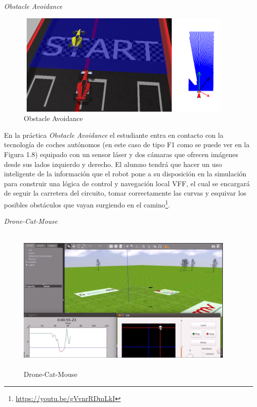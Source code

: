 \vspace{1cm}
\hspace{0.35\linewidth}
\textit{Obstacle Avoidance}

\begin{figure}[H]
  \begin{center}
    \includegraphics[width=0.95\textwidth, height=5cm]{figures/obstacle_avoidance.png}
		\caption{Obstacle Avoidance}
		\label{fig.obstacleavoidance}
		\end{center}
\end{figure}

En la práctica \textit{Obstacle Avoidance} el estudiante entra en contacto con la tecnología de coches autónomos (en este caso de tipo F1 como se puede ver en la Figura 1.8) equipado con un sensor láser y dos cámaras que ofrecen imágenes desde sus lados izquierdo y derecho. El alumno tendrá que hacer un uso inteligente de la información que el robot pone a su disposición en la simulación para construir una lógica de control y navegación local VFF, el cual se encargará de seguir la carretera del circuito, tomar correctamente las curvas y esquivar los posibles obstáculos que vayan surgiendo en el camino\footnote{\url{https://youtu.be/gVvnrRDmLkI}}.

\hspace{0.35\linewidth}
\textit{Drone-Cat-Mouse}

\begin{figure}[H]
  \begin{center}
    \includegraphics[width=0.95\textwidth, height=7.2cm]{figures/dronecatmouse.png}
		\caption{Drone-Cat-Mouse}
		\label{fig.dronecatmouse}
		\end{center}
\end{figure}

